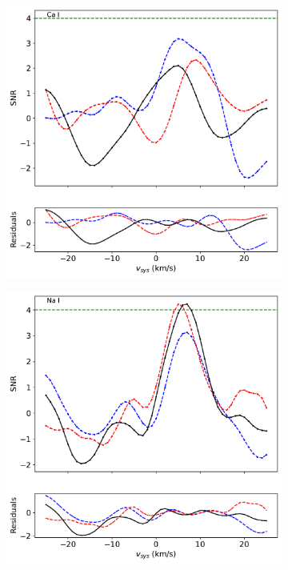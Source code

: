 \documentclass[twocolumn]{aastex631}
\begin{document}
\begin{figure}[ht!]
\begin{subfigure}[b]{0.3\textwidth}
                \end{subfigure}
                \begin{subfigure}[b]{0.3\textwidth}
                    \centering
                    \includegraphics[width=\textwidth]{plots-updated/line-profile-overlaidarms/KELT-20b.20190504.combined.Ca I.line-profiles-overlaidarms.pdf}
                \end{subfigure}
                \begin{subfigure}[b]{0.3\textwidth}
                    \centering
                    \includegraphics[width=\textwidth]{plots-updated/line-profile-overlaidarms/KELT-20b.20190504.combined.Na I.line-profiles-overlaidarms.pdf}

\end{subfigure}
\end{figure}
\end{document}
